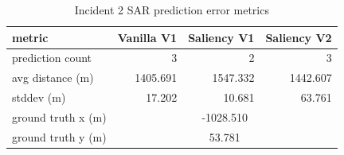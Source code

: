 \begin{table}[ht]
\centering
\caption{Incident 2 SAR prediction error metrics}
\label{tab:sar-incident-2}
\begin{tabular}{lrrr}
\hline
metric & Vanilla V1 & Saliency V1 & Saliency V2 \\
\hline
prediction count & 3 & 2 & 3 \\
avg distance (m) & 1405.691 & 1547.332 & 1442.607 \\
stddev (m) & 17.202 & 10.681 & 63.761 \\
ground truth x (m) & \multicolumn{3}{c}{-1028.510} \\
ground truth y (m) & \multicolumn{3}{c}{53.781} \\
\hline
\end{tabular}
\end{table}
